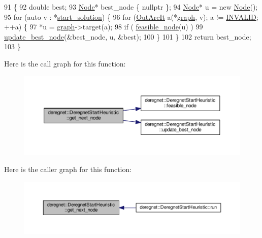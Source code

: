 \begin{DoxyCode}
91                                             \{
92     \textcolor{keywordtype}{double} best;
93     \hyperlink{namespacederegnet_a744bad34f2de9856d36715a445f027f3}{Node}* best\_node \{ \textcolor{keyword}{nullptr} \};
94     \hyperlink{namespacederegnet_a744bad34f2de9856d36715a445f027f3}{Node}* u = \textcolor{keyword}{new} \hyperlink{namespacederegnet_a744bad34f2de9856d36715a445f027f3}{Node}();
95     \textcolor{keywordflow}{for} (\textcolor{keyword}{auto} v : *\hyperlink{classderegnet_1_1DeregnetStartHeuristic_a7450e11ca0a265b055f95e7832b65e2f}{start\_solution}) \{
96         \textcolor{keywordflow}{for} (\hyperlink{namespacederegnet_a253cef939ea250e4cc0c967cd0117853}{OutArcIt} a(*\hyperlink{classderegnet_1_1DeregnetStartHeuristic_a4da8e53fc7c0fa3dbe0e3ef07296d75e}{graph}, v); a != \hyperlink{usinglemon_8h_adf770fe2eec438e3758ffe905dbae208}{INVALID}; ++a) \{
97             *u = \hyperlink{classderegnet_1_1DeregnetStartHeuristic_a4da8e53fc7c0fa3dbe0e3ef07296d75e}{graph}->target(a);
98             \textcolor{keywordflow}{if} ( \hyperlink{classderegnet_1_1DeregnetStartHeuristic_ac296c4f122f7d3ad2fcc2cbb0d1b5379}{feasible\_node}(u) )
99                 \hyperlink{classderegnet_1_1DeregnetStartHeuristic_a50179ff9db4d416b93ff41d1dcee1358}{update\_best\_node}(&best\_node, u, &best);
100         \}
101     \}
102     \textcolor{keywordflow}{return} best\_node;
103 \}
\end{DoxyCode}


Here is the call graph for this function\+:\nopagebreak
\begin{figure}[H]
\begin{center}
\leavevmode
\includegraphics[width=350pt]{classderegnet_1_1DeregnetStartHeuristic_a6ec478444151e54625951f858ff76761_cgraph}
\end{center}
\end{figure}




Here is the caller graph for this function\+:\nopagebreak
\begin{figure}[H]
\begin{center}
\leavevmode
\includegraphics[width=350pt]{classderegnet_1_1DeregnetStartHeuristic_a6ec478444151e54625951f858ff76761_icgraph}
\end{center}
\end{figure}



